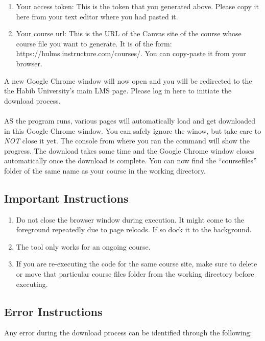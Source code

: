 \documentclass{article}
\begin{document}
\begin{enumerate}
\def\labelenumi{\arabic{enumi}.}
\item Your access token: This is
the token that you generated above. Please copy it here from your text
editor where you had pasted it. 
\item Your course url: This is the URL of
the Canvas site of the course whose course file you want to generate. It is of the form: https://hulms.instructure.com/courses/. You can
copy-paste it from your browser.
\end{enumerate}

A new Google Chrome window will now open and you will be redirected to
the the Habib University's main LMS page. Please log in here to initiate
the download process.
\\\\AS the program runs, various pages will automatically load and get
downloaded in this Google Chrome window. You can safely ignore the
winow, but take care to \emph{NOT} close it yet. The console from where
you ran the command will show the progress. The download takes some time
and the Google Chrome window closes automatically once the download is
complete. You can now find the ``coursefiles'' folder of the same name
as your course in the working directory.

\subsection{Important Instructions}

\begin{enumerate}
\def\labelenumi{\arabic{enumi}.}
\item
  Do not close the browser window during execution. It might come to the
  foreground repeatedly due to page reloads. If so dock it to the
  background.
\item
  The tool only works for an ongoing course.
  \item If you are re-executing the code for the same course site, make sure to delete or move that particular course files folder from the working directory before executing.
\end{enumerate}

\subsection{Error Instructions}
Any error during the download process can be identified through the
following:
\end{document}

